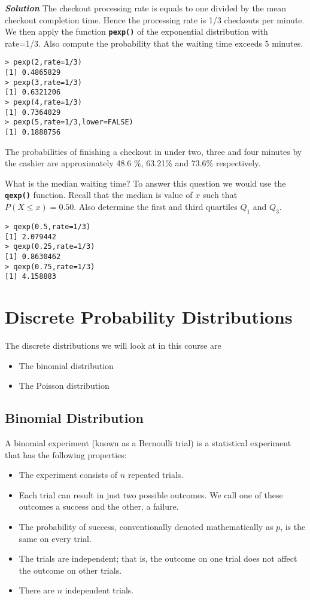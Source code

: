 \documentclass[a4paper,12pt]{article}
\begin{document}
\textbf{\emph{Solution}} The checkout processing rate is equals to one divided by the mean checkout completion time. 
Hence the processing rate is 1/3 checkouts per minute. We then apply the function \texttt{\textbf{pexp()}} of the exponential distribution with rate=1/3. 
Also compute the probability that the waiting time exceeds 5 minutes.
\begin{verbatim}
> pexp(2,rate=1/3)
[1] 0.4865829
> pexp(3,rate=1/3)
[1] 0.6321206
> pexp(4,rate=1/3)
[1] 0.7364029
> pexp(5,rate=1/3,lower=FALSE)
[1] 0.1888756
\end{verbatim}
The probabilities of finishing a checkout in under two, three and four minutes by the cashier are approximately 48.6 \%, 63.21\% and 73.6\% respectively. 

What is the median waiting time? To answer this question we would use the \texttt{\textbf{qexp()}} function. Recall that the median is value of $x$ such that $P(X \leq x) = 0.50$.
Also determine the first and third quartiles $Q_1$ and $Q_3$.
\begin{verbatim}
> qexp(0.5,rate=1/3)
[1] 2.079442
> qexp(0.25,rate=1/3)
[1] 0.8630462
> qexp(0.75,rate=1/3)
[1] 4.158883
\end{verbatim}
\newpage


\section{Discrete Probability Distributions}
The discrete distributions we will look at in this course are
\begin{itemize}
\item The binomial distribution
\item The Poisson distribution
\end{itemize}
\subsection{Binomial Distribution}

A binomial experiment (known as a Bernoulli trial) is a statistical experiment that has the following properties: 

\begin{itemize}
\item	The experiment consists of $n$ repeated trials.
\item	Each trial can result in just two possible outcomes. We call one of these outcomes a success and the other, a failure.
\item	The probability of success, conventionally denoted mathematically as $p$, is the same on every trial.
\item	The trials are independent; that is, the outcome on one trial does not affect the outcome on other trials.
\item	There are $n$ independent trials.
\end{itemize}
 
\end{document}
